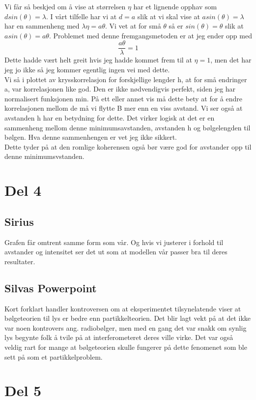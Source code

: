 \documentclass[12pt,norsk,a4paper]{article}
\begin{document}
Vi får så beskjed om å vise at størrelsen $\eta$ har et lignende opphav som $dsin(\theta) = \lambda$.
I vårt tilfelle har vi at $d = a$ slik at vi skal vise at $asin(\theta) = \lambda$ har en sammenheng med $\lambda\eta = a\theta$.
Vi vet at for små $\theta$ så er $sin(\theta)=\theta$ slik at $asin(\theta)=a\theta$. Problemet med denne fremgangsmetoden er at jeg ender opp med $$\frac{a\theta}{\lambda} = 1$$
Dette hadde vært helt greit hvis jeg hadde kommet frem til at $\eta = 1$, men det har jeg jo ikke så jeg kommer egentlig ingen vei med dette.\\
Vi så i plottet av krysskorrelasjon for forskjellige lengder h, at for små endringer a, var korrelasjonen like god.
Den er ikke nødvendigvis perfekt, siden jeg har normalisert funksjonen min. På ett eller annet vis må dette bety at for å endre korrelasjonen mellom de må vi flytte B mer enn en viss avstand. Vi ser også at avstanden h har en betydning for dette. Det virker logisk at det er en sammenheng mellom denne minimumsavstanden, avstanden h og bølgelengden til bølgen. Hva denne sammenhengen er vet jeg ikke sikkert.\\
Dette tyder på at den romlige koherensen også bør være god for avstander opp til denne minimumsvstanden.

\section{Del 4}
\subsection{Sirius}
Grafen får omtrent samme form som vår. Og hvis vi justerer i forhold til avstander og intensitet ser det ut som at modellen vår passer bra til deres resultater.
\subsection{Silvas Powerpoint}
Kort forklart handler kontroversen om at eksperimentet tilsynelatende viser at bølgeteorien til lys er bedre enn partikkelteorien.
Det blir lagt vekt på at det ikke var noen kontrovers ang. radiobølger, men med en gang det var snakk om synlig lys begynte folk å tvile på at interferometeret deres ville virke. Det var også veldig rart for mange at bølgeteorien skulle fungerer på dette fenomenet som ble sett på som et partikkelproblem.

\newpage
\section{Del 5}
\end{document}
